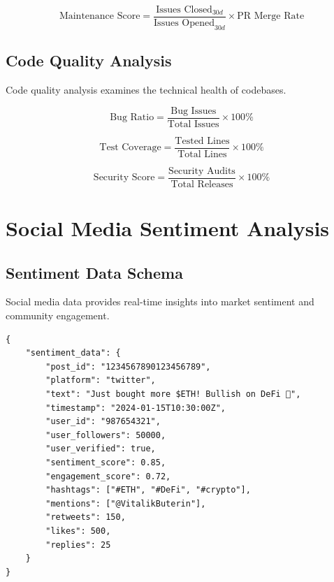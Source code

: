 \documentclass[12pt,a4paper]{article}
\begin{document}
\begin{equation}
\text{Maintenance Score} = \frac{\text{Issues Closed}_{30d}}{\text{Issues Opened}_{30d}} \times \text{PR Merge Rate}
\end{equation}

\subsection{Code Quality Analysis}

Code quality analysis examines the technical health of codebases.

\begin{equation}
\text{Bug Ratio} = \frac{\text{Bug Issues}}{\text{Total Issues}} \times 100\%
\end{equation}

\begin{equation}
\text{Test Coverage} = \frac{\text{Tested Lines}}{\text{Total Lines}} \times 100\%
\end{equation}

\begin{equation}
\text{Security Score} = \frac{\text{Security Audits}}{\text{Total Releases}} \times 100\%
\end{equation}

\section{Social Media Sentiment Analysis}

\subsection{Sentiment Data Schema}

Social media data provides real-time insights into market sentiment and community engagement.

\begin{lstlisting}
{
    "sentiment_data": {
        "post_id": "1234567890123456789",
        "platform": "twitter",
        "text": "Just bought more $ETH! Bullish on DeFi 🚀",
        "timestamp": "2024-01-15T10:30:00Z",
        "user_id": "987654321",
        "user_followers": 50000,
        "user_verified": true,
        "sentiment_score": 0.85,
        "engagement_score": 0.72,
        "hashtags": ["#ETH", "#DeFi", "#crypto"],
        "mentions": ["@VitalikButerin"],
        "retweets": 150,
        "likes": 500,
        "replies": 25
    }
}
\end{lstlisting}
\end{document}
